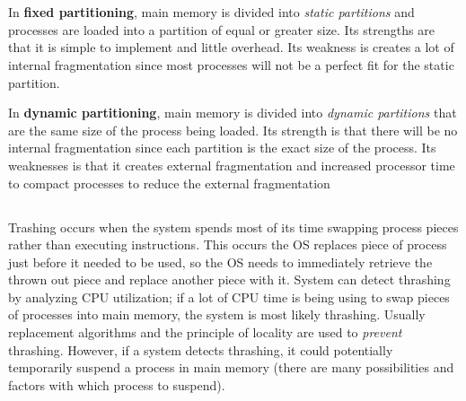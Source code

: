 \documentclass[11pt,letterpaper]{article}
\begin{document}
	\section{}
		\subsection{}
			{ %
				\paragraph{}
				In \textbf{fixed partitioning}, main memory is divided into \textit{static partitions} and processes are loaded into a partition of equal or greater size. Its strengths are that it is simple to implement and little overhead. Its weakness is creates a lot of internal fragmentation since most processes will not be a perfect fit for the static partition.
				
				In \textbf{dynamic partitioning}, main memory is divided into \textit{dynamic partitions} that are the same size of the process being loaded. Its strength is that there will be no internal fragmentation since each partition is the exact size of the process. Its weaknesses is that it creates external fragmentation and increased processor time to compact processes to reduce the external fragmentation
			}
		\subsection{}
			\paragraph{}
			{ %
				Trashing occurs when the system spends most of its time swapping process pieces rather than executing instructions. This occurs the OS replaces piece of process just before it needed to be used, so the OS needs to immediately retrieve the thrown out piece and replace another piece with it. System can detect thrashing by analyzing CPU utilization; if a lot of CPU time is being using to swap pieces of processes into main memory, the system is most likely thrashing. Usually replacement algorithms and the principle of locality are used to \textit{prevent} thrashing. However, if a system detects thrashing, it could potentially temporarily suspend a process in main memory (there are many possibilities and factors with which process to suspend).
			}
\end{document}
